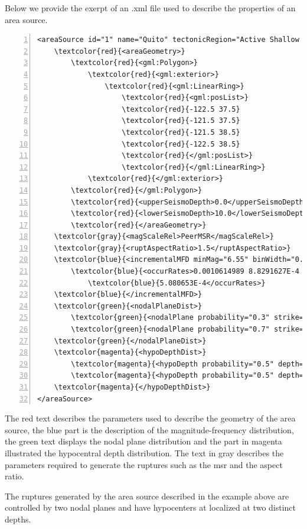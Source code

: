 Below we provide the exerpt of an .xml file used to describe the properties of
an area source.
\begin{Verbatim}[frame=single, commandchars=\\\{\}, fontsize=\footnotesize,
numbers=left, numbersep=2pt]
<areaSource id="1" name="Quito" tectonicRegion="Active Shallow Crust">
    \textcolor{red}{<areaGeometry>}
        \textcolor{red}{<gml:Polygon>}
            \textcolor{red}{<gml:exterior>}
                \textcolor{red}{<gml:LinearRing>}
                    \textcolor{red}{<gml:posList>}
                    \textcolor{red}{-122.5 37.5}
                    \textcolor{red}{-121.5 37.5}
                    \textcolor{red}{-121.5 38.5}
                    \textcolor{red}{-122.5 38.5}
                    \textcolor{red}{</gml:posList>}
                    \textcolor{red}{</gml:LinearRing>}
            \textcolor{red}{</gml:exterior>}
        \textcolor{red}{</gml:Polygon>}
        \textcolor{red}{<upperSeismoDepth>0.0</upperSeismoDepth>}
        \textcolor{red}{<lowerSeismoDepth>10.0</lowerSeismoDepth>}
        \textcolor{red}{</areaGeometry>}
    \textcolor{gray}{<magScaleRel>PeerMSR</magScaleRel>}
    \textcolor{gray}{<ruptAspectRatio>1.5</ruptAspectRatio>}
    \textcolor{blue}{<incrementalMFD minMag="6.55" binWidth="0.1">}
        \textcolor{blue}{<occurRates>0.0010614989 8.8291627E-4 7.3437777E-4 6.108288E-4}
		    \textcolor{blue}{5.080653E-4</occurRates>}
    \textcolor{blue}{</incrementalMFD>}
    \textcolor{green}{<nodalPlaneDist>}
        \textcolor{green}{<nodalPlane probability="0.3" strike="0.0" dip="90.0" rake="0.0"/>}
        \textcolor{green}{<nodalPlane probability="0.7" strike="90.0" dip="45.0" rake="90.0"/>}
    \textcolor{green}{</nodalPlaneDist>}
    \textcolor{magenta}{<hypoDepthDist>}
        \textcolor{magenta}{<hypoDepth probability="0.5" depth="4.0" />}
        \textcolor{magenta}{<hypoDepth probability="0.5" depth="8.0" />}
    \textcolor{magenta}{</hypoDepthDist>}
</areaSource>
\end{Verbatim}
The red text describes the parameters used to describe the geometry of 
the area source, the blue part is the description
of the magnitude-frequency distribution, the green text displays the nodal 
plane distribution and the part in magenta illustrated the hypocentral depth 
distribution.
%
The text in gray describes the parameters required to generate the ruptures 
such as the \gls{msr} and the aspect ratio.

The ruptures generated by the area source described in the example above 
are controlled by two nodal planes and have hypocenters at localized 
at two distinct depths. 
%
